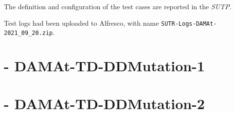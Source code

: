The definition and configuration of the test cases are reported in the \emph{SUTP}.

Test logs had been uploaded to Alfresco, with name \texttt{SUTR-Logs-DAMAt-2021\_09\_20.zip}.

\section{\DAMA - DAMAt-TD-DDMutation-1}



\section{\DAMA - DAMAt-TD-DDMutation-2}



\clearpage
